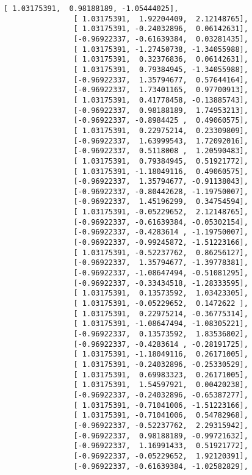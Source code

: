 \documentclass[11pt]{article}
\begin{document}
\begin{Verbatim}[commandchars=\\\{\}]
                [ 1.03175391,  0.98188189, -1.05444025],
                [ 1.03175391,  1.92204409,  2.12148765],
                [ 1.03175391, -0.24032896,  0.06142631],
                [-0.96922337, -0.61639384,  0.03281435],
                [ 1.03175391, -1.27450738, -1.34055988],
                [ 1.03175391,  0.32376836,  0.06142631],
                [ 1.03175391,  0.79384945, -1.34055988],
                [-0.96922337,  1.35794677,  0.57644164],
                [-0.96922337,  1.73401165,  0.97700913],
                [ 1.03175391,  0.41778458, -0.13885743],
                [-0.96922337,  0.98188189,  1.74953213],
                [-0.96922337, -0.8984425 ,  0.49060575],
                [ 1.03175391,  0.22975214,  0.23309809],
                [-0.96922337,  1.63999543,  1.72092016],
                [-0.96922337,  0.5118008 ,  1.20590483],
                [ 1.03175391,  0.79384945,  0.51921772],
                [ 1.03175391, -1.18049116,  0.49060575],
                [-0.96922337,  1.35794677, -0.91138043],
                [-0.96922337, -0.80442628, -1.19750007],
                [-0.96922337,  1.45196299,  0.34754594],
                [ 1.03175391, -0.05229652,  2.12148765],
                [-0.96922337, -0.61639384, -0.05302154],
                [-0.96922337, -0.4283614 , -1.19750007],
                [-0.96922337, -0.99245872, -1.51223166],
                [ 1.03175391, -0.52237762,  0.86256127],
                [-0.96922337,  1.35794677, -1.39778381],
                [-0.96922337, -1.08647494, -0.51081295],
                [-0.96922337, -0.33434518, -1.28333595],
                [ 1.03175391,  0.13573592,  1.03423305],
                [ 1.03175391, -0.05229652,  0.1472622 ],
                [ 1.03175391,  0.22975214, -0.36775314],
                [ 1.03175391, -1.08647494, -1.08305221],
                [-0.96922337,  0.13573592,  1.83536802],
                [-0.96922337, -0.4283614 , -0.28191725],
                [ 1.03175391, -1.18049116,  0.26171005],
                [ 1.03175391, -0.24032896, -0.25330529],
                [ 1.03175391,  0.69983323,  0.26171005],
                [ 1.03175391,  1.54597921,  0.00420238],
                [-0.96922337, -0.24032896, -0.65387277],
                [ 1.03175391, -0.71041006, -1.51223166],
                [ 1.03175391, -0.71041006,  0.54782968],
                [-0.96922337, -0.52237762,  2.29315942],
                [-0.96922337,  0.98188189, -0.99721632],
                [-0.96922337,  1.16991433,  0.51921772],
                [-0.96922337, -0.05229652,  1.92120391],
                [-0.96922337, -0.61639384, -1.02582829],

\end{Verbatim}
\end{document}
